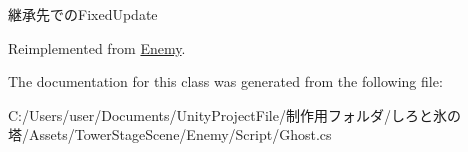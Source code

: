 継承先での\+Fixed\+Update 



Reimplemented from \hyperlink{class_enemy_ab19a73003a5b443ba93f4b6a45c0abad}{Enemy}.



The documentation for this class was generated from the following file\+:\begin{DoxyCompactItemize}
\item 
C\+:/\+Users/user/\+Documents/\+Unity\+Project\+File/制作用フォルダ/しろと氷の塔/\+Assets/\+Tower\+Stage\+Scene/\+Enemy/\+Script/Ghost.\+cs\end{DoxyCompactItemize}
